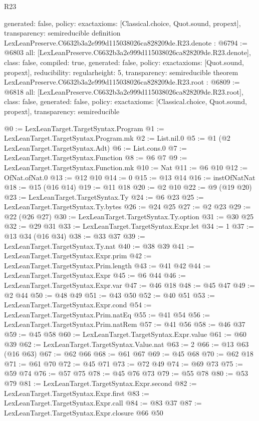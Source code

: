\begin{lexlean}{R23}
\begin{coremodule}
{  generated: false,
  policy: exact{axioms: [Classical.choice, Quot.sound, propext]},
  transparency: semireducible
}
definition LexLeanPreserve.C6632b3a2e999d115038026ca828209de.R23.denote : @6794 := @6803 {
  all: [LexLeanPreserve.C6632b3a2e999d115038026ca828209de.R23.denote],
  class: false,
  compiled: true,
  generated: false,
  policy: exact{axioms: [Quot.sound, propext]},
  reducibility: regular{height: 5},
  transparency: semireducible
}
theorem LexLeanPreserve.C6632b3a2e999d115038026ca828209de.R23.root : @6809 := @6818 {
  all: [LexLeanPreserve.C6632b3a2e999d115038026ca828209de.R23.root],
  class: false,
  generated: false,
  policy: exact{axioms: [Classical.choice, Quot.sound, propext]},
  transparency: semireducible
}

@0 := LexLeanTarget.TargetSyntax.Program
@1 := LexLeanTarget.TargetSyntax.Program.mk
@2 := List.nil.{0}
@5 := @1 (@2 LexLeanTarget.TargetSyntax.Adt)
@6 := List.cons.{0}
@7 := LexLeanTarget.TargetSyntax.Function
@8 := @6 @7
@9 := LexLeanTarget.TargetSyntax.Function.mk
@10 := Nat
@11 := @6 @10
@12 := OfNat.ofNat.{0}
@13 := @12 @10
@14 := 0
@15 := @13 @14
@16 := instOfNatNat
@18 := @15 (@16 @14)
@19 := @11 @18
@20 := @2 @10
@22 := @9 (@19 @20)
@23 := LexLeanTarget.TargetSyntax.Ty
@24 := @6 @23
@25 := LexLeanTarget.TargetSyntax.Ty.bytes
@26 := @24 @25
@27 := @2 @23
@29 := @22 (@26 @27)
@30 := LexLeanTarget.TargetSyntax.Ty.option
@31 := @30 @25
@32 := @29 @31
@33 := LexLeanTarget.TargetSyntax.Expr.let
@34 := 1
@37 := @13 @34 (@16 @34)
@38 := @33 @37
@39 := LexLeanTarget.TargetSyntax.Ty.nat
@40 := @38 @39
@41 := LexLeanTarget.TargetSyntax.Expr.prim
@42 := LexLeanTarget.TargetSyntax.Prim.length
@43 := @41 @42
@44 := LexLeanTarget.TargetSyntax.Expr
@45 := @6 @44
@46 := LexLeanTarget.TargetSyntax.Expr.var
@47 := @46 @18
@48 := @45 @47
@49 := @2 @44
@50 := @48 @49
@51 := @43 @50
@52 := @40 @51
@53 := LexLeanTarget.TargetSyntax.Expr.cond
@54 := LexLeanTarget.TargetSyntax.Prim.natEq
@55 := @41 @54
@56 := LexLeanTarget.TargetSyntax.Prim.natRem
@57 := @41 @56
@58 := @46 @37
@59 := @45 @58
@60 := LexLeanTarget.TargetSyntax.Expr.value
@61 := @60 @39
@62 := LexLeanTarget.TargetSyntax.Value.nat
@63 := 2
@66 := @13 @63 (@16 @63)
@67 := @62 @66
@68 := @61 @67
@69 := @45 @68
@70 := @62 @18
@71 := @61 @70
@72 := @45 @71
@73 := @72 @49
@74 := @69 @73
@75 := @59 @74
@76 := @57 @75
@78 := @45 @76 @73
@79 := @55 @78
@80 := @53 @79
@81 := LexLeanTarget.TargetSyntax.Expr.second
@82 := LexLeanTarget.TargetSyntax.Expr.first
@83 := LexLeanTarget.TargetSyntax.Expr.call
@84 := @83 @37
@87 := LexLeanTarget.TargetSyntax.Expr.closure @66 @50

\end{coremodule}
\end{lexlean}
